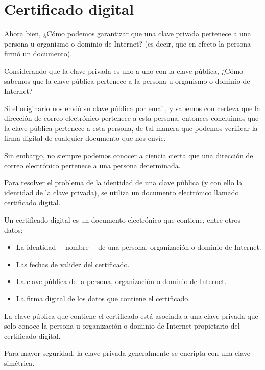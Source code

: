 \section{Certificado digital}

Ahora bien, ¿Cómo podemos garantizar que una clave privada pertenece a una persona u organismo o dominio de Internet? (es decir, que en efecto la persona firmó un documento). 

Considerando que la clave privada es uno a uno con la clave pública, ¿Cómo sabemos que la clave pública pertenece a la persona u organismo o dominio de Internet?

Si el originario nos envió su clave pública por email, y sabemos con certeza que la dirección de correo electrónico pertenece a esta persona, entonces concluimos que la clave pública pertenece a esta persona, de tal manera que podemos verificar la firma digital de cualquier documento que nos envíe.

Sin embargo, no siempre podemos conocer a ciencia cierta que una dirección de correo electrónico pertenece a una persona determinada.

Para resolver el problema de la identidad de una clave pública (y con ello la identidad de la clave privada), se utiliza un documento electrónico llamado certificado digital.

Un certificado digital es un documento electrónico que contiene, entre otros datos:

\begin{itemize}

\item La identidad —nombre— de una persona, organización o dominio de Internet.

\item Las fechas de validez del certificado.

\item La clave pública de la persona, organización o dominio de Internet.

\item La firma digital de los datos que contiene el certificado.

\end{itemize}

La clave pública que contiene el certificado está asociada a una clave privada que solo conoce la persona u organización o dominio de Internet propietario del certificado digital.

Para mayor seguridad, la clave privada generalmente se encripta con una clave simétrica.

